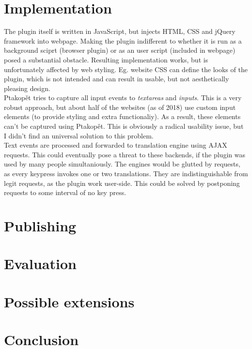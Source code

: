 \documentclass[a4paper]{article}
\begin{document}
\section*{Implementation}
The plugin itself is written in JavaScript, but injects HTML, CSS and jQuery framework into webpage. Making the plugin indifferent to whether it is run as a background sciprt (browser plugin) or as an user script (included in webpage) posed a substantial obstacle. Resulting implementation works, but is unfortunately affected by web styling. Eg.  website CSS can define the looks of the plugin, which is not intended and can result in usable, but not aesthetically pleasing design. \\
Ptakopět tries to capture all input events to \textit{textareas} and \textit{inputs}. This is a very robust approach, but about half of the websites (as of 2018) use custom input elements (to provide styling and extra functionaliy). As a result, these elements can't be captured using Ptakopět. This is obviously a radical usability issue, but I didn't find an universal solution to this problem. \\
Text events are processed and forwarded to translation engine using AJAX requests. This could eventually pose a threat to these backends, if the plugin was used by many people simultaniously. The engines would be glutted by requests, as every keypress invokes one or two translations. They are indistinguishable from legit requests, as the plugin work user-side. This could be solved by postponing requests to some interval of no key press.


\section*{Publishing}

\section*{Evaluation}

\section*{Possible extensions}

\section*{Conclusion}
\end{document}
